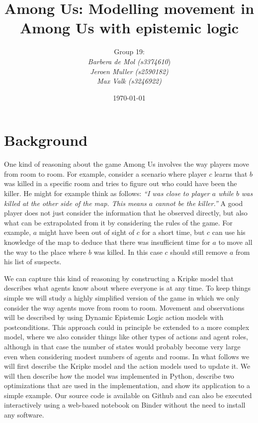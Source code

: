 \documentclass[a4paper]{scrartcl}
\title{Among Us: Modelling movement in Among Us with epistemic logic}
\author{Group 19:\\
\emph{Barbera de Mol (s3374610})\\
\emph{Jeroen Muller (s2590182)} \\
\emph{Max Valk (s3246922)}
}
\date{\today}
\begin{document}
\maketitle

\section*{Background}
One kind of reasoning about the game Among Us involves the way players move from room to room. For example, consider a scenario where player $c$ learns that $b$ was killed in a specific room and tries to figure out who could have been the killer. He might for example think as follows: \emph{``I was close to player $a$ while $b$ was killed at the other side of the map. This means $a$ cannot be the killer.''} A good player does not just consider the information that he observed directly, but also what can be extrapolated from it by considering the rules of the game. For example, $a$ might have been out of sight of $c$ for a short time, but $c$ can use his knowledge of the map to deduce that there was insufficient time for $a$ to move all the way to the place where $b$ was killed. In this case $c$ should still remove $a$ from his list of suspects.

We can capture this kind of reasoning by constructing a Kripke model that describes what agents know about where everyone is at any time. To keep things simple we will study a highly simplified version of the game in which we only consider the way agents move from room to room. Movement and observations will be described by using Dynamic Epistemic Logic action models \cite{Ditmarsch2007DynamicEL} with postconditions\cite{postconditions}. This approach could in principle be extended to a more complex model, where we also consider  things like other types of actions and agent roles, although in that case the number of states would probably become very large even when considering modest numbers of agents and rooms. In what follows we will first describe the Kripke model and the action models used to update it. We will then describe how the model was implemented in Python, describe two optimizations that are used in the implementation, and show its application to a simple example. Our source code is available on Github and can also be executed interactively using a web-based notebook on Binder without the need to install any software. 
\end{document}
